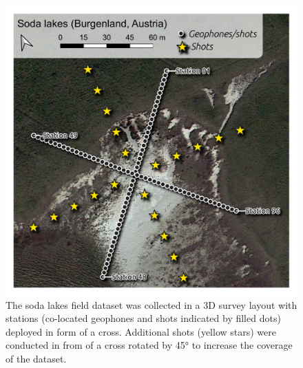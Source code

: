 \documentclass[a4paper,fleqn]{cas-sc}
\begin{document}
\begin{figure}
	\centering
	\includegraphics[width=.75\textwidth]{./figures/map_sodalakes.pdf}
	\caption{The soda lakes field dataset was collected in a 3D survey layout with stations (co-located geophones and shots indicated by filled dots) deployed in form of a cross. Additional shots (yellow stars) were conducted in from of a cross rotated by 45° to increase the coverage of the dataset.}
	\label{fig:map_sodalakes}
\end{figure}
\end{document}
